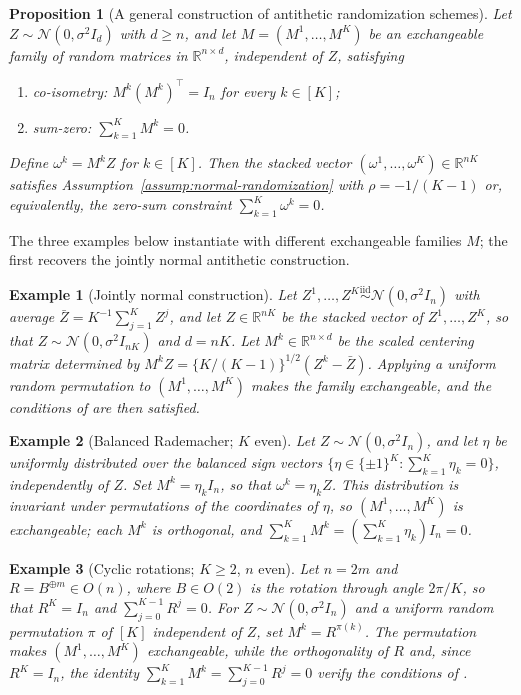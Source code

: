 \documentclass[12pt]{article}
\newtheorem{proposition}{Proposition}[section]
\def\R{\mathbb{R}}
\def\calN{\mathcal{N}}
\newcommand{\tran}{^\intercal}
\theoremstyle{general}
\newtheorem{example}{Example}[section]
\begin{document}
\begin{proposition}[A general construction of antithetic randomization schemes]
\label{lem: recipe:AR}
Let $Z\sim\calN(0,\sigma^2I_d)$ with $d\geq n$, and let $M=(M^1,\ldots,M^K)$ be an exchangeable family of random matrices in $\R^{n\times d}$, independent of $Z$, satisfying
\begin{enumerate}[label=(\roman*)]
    \item\label{cond:co-isometry} \emph{co-isometry:} $M^k(M^k)\tran=I_n$ for every $k\in[K]$;
    \item\label{cond:sum-zero-matrices} \emph{sum-zero:} $\displaystyle\sum_{k=1}^K M^k=0$.
\end{enumerate}
Define $\omega^k=M^kZ$ for $k\in[K]$.
Then the stacked vector $(\omega^1,\ldots,\omega^K)\in\R^{nK}$ satisfies Assumption~\ref{assump:normal-randomization} with $\rho=-1/(K-1)$ or, equivalently, the zero-sum constraint $\sum_{k=1}^K\omega^k=0$.
\end{proposition}


The three examples below instantiate  with different exchangeable families $M$; the first recovers the jointly normal antithetic construction.


\begin{example}[Jointly normal construction]\label{ex:normal}
Let $Z^1,\ldots,Z^K\stackrel{\mathrm{iid}}{\sim}\calN(0,\sigma^2I_n)$ with average $\bar Z=K^{-1}\sum_{j=1}^K Z^j$, and let $Z\in\R^{nK}$ be the stacked vector of $Z^1,\ldots,Z^K$, so that $Z\sim\calN(0,\sigma^2I_{nK})$ and $d=nK$.
Let $M^k\in\R^{n\times d}$ be the scaled centering matrix determined by
$M^kZ=\{K/(K-1)\}^{1/2}(Z^k-\bar Z)$.
Applying a uniform random permutation to $(M^1,\ldots,M^K)$ makes the family exchangeable, and the conditions of  are then satisfied.
\end{example}

\begin{example}[Balanced Rademacher; $K$ even]\label{ex:rademacher}
Let $Z\sim\calN(0,\sigma^2I_n)$, and let $\eta$ be uniformly distributed over the balanced sign vectors $\{\eta\in\{\pm1\}^K:\sum_{k=1}^K\eta_k=0\}$, independently of $Z$.
Set $M^k=\eta_kI_n$, so that $\omega^k=\eta_kZ$.
This distribution is invariant under permutations of the coordinates of $\eta$, so $(M^1,\ldots,M^K)$ is exchangeable; each $M^k$ is orthogonal, and $\sum_{k=1}^K M^k=(\sum_{k=1}^K\eta_k)I_n=0$.
\end{example}

\begin{example}[Cyclic rotations; $K\ge2$, $n$ even]\label{ex:rotations}
Let $n=2m$ and $R=B^{\oplus m}\in O(n)$, where $B\in O(2)$ is the rotation through angle $2\pi/K$, so that $R^K=I_n$ and $\sum_{j=0}^{K-1}R^j=0$.
For $Z\sim\calN(0,\sigma^2I_n)$ and a uniform random permutation $\pi$ of $[K]$ independent of $Z$, set $M^k=R^{\pi(k)}$.
The permutation makes $(M^1,\ldots,M^K)$ exchangeable, while the orthogonality of $R$ and, since $R^K=I_n$, the identity $\sum_{k=1}^K M^k=\sum_{j=0}^{K-1}R^j=0$ verify the conditions of .
\end{example}
\end{document}

